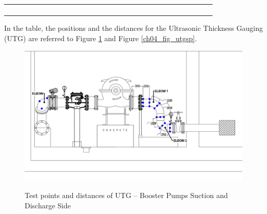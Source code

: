 \begin{table}[h]
{\begin{tabular}{l|l|l|l|l|l|l|l|l|l|lllllllllllllllllll}
\multicolumn{1}{l}{} & \multicolumn{1}{l}{} & \multicolumn{1}{l}{} & \multicolumn{1}{l}{} & \multicolumn{1}{l}{} & \multicolumn{1}{l}{} & \multicolumn{1}{l}{} & \multicolumn{1}{l}{} & \multicolumn{1}{l}{} & \multicolumn{1}{l}{} &  &  &  &  &  &  &  &  &  &  &  &  &  &  &  &  &  &  &  \\ 
\multicolumn{1}{l}{} & \multicolumn{1}{l}{} & \multicolumn{1}{l}{} & \multicolumn{1}{l}{} & \multicolumn{1}{l}{} & \multicolumn{1}{l}{} & \multicolumn{1}{l}{} & \multicolumn{1}{l}{} & \multicolumn{1}{l}{} & \multicolumn{1}{l}{} &  &  &  &  &  &  &  &  &  &  &  &  &  &  &  &  &  &  &  \\ 
\multicolumn{1}{l}{} & \multicolumn{1}{l}{} & \multicolumn{1}{l}{} & \multicolumn{1}{l}{} & \multicolumn{1}{l}{} & \multicolumn{1}{l}{} & \multicolumn{1}{l}{} & \multicolumn{1}{l}{} & \multicolumn{1}{l}{} & \multicolumn{1}{l}{} &  &  &  &  &  &  &  &  &  &  &  &  &  &  &  &  &  &  &  \\ 
\multicolumn{1}{l}{} & \multicolumn{1}{l}{} & \multicolumn{1}{l}{} & \multicolumn{1}{l}{} & \multicolumn{1}{l}{} & \multicolumn{1}{l}{} & \multicolumn{1}{l}{} & \multicolumn{1}{l}{} & \multicolumn{1}{l}{} & \multicolumn{1}{l}{} &  &  &  &  &  &  &  &  &  &  &  &  &  &  &  &  &  &  &  \\ 
\end{tabular}

	}
\end{table}

In the table, the positions and the distances for the Ultrasonic Thickness Gauging (UTG) are referred to Figure \ref{ch04_fig_utgbp} and Figure \ref{ch04_fig_utgsp}.

\begin{figure}[!htb]
	\includegraphics[scale=0.3]{figures/ch04_fig_utgbp} \\
	\caption{Test points and distances of UTG – Booster Pumps Suction and Discharge Side}
	\label{ch04_fig_utgbp} 
\end{figure}

